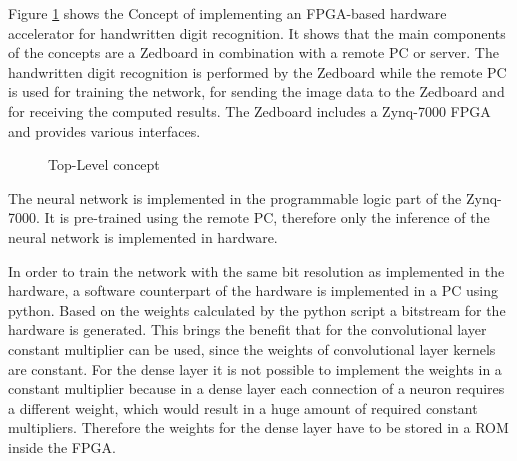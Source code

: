 Figure \ref{FIG:concept} shows the Concept of implementing an FPGA-based hardware accelerator for handwritten digit recognition. It shows that the main components of the concepts are a Zedboard in combination with a remote PC or server. The handwritten digit recognition is performed by the Zedboard while the remote PC is used for training the network, for sending the image data to the Zedboard and for receiving the computed results.  The Zedboard includes a Zynq-7000 FPGA and provides various interfaces.

\begin{figure}[h]
	\centering
	
	\caption[Top-Level concept.]{Top-Level concept}
	\label{FIG:concept}
\end{figure}


The neural network is implemented in the programmable logic part of the Zynq-7000. It is pre-trained using the remote PC, therefore only the inference of the neural network is implemented in hardware.

In order to train the network with the same bit resolution as implemented in the hardware, a software counterpart of the hardware is implemented in a PC using python. 
Based on the weights calculated by the python script a bitstream for the hardware is generated. This brings the benefit that for the convolutional layer constant multiplier can be used, since the weights of convolutional layer kernels are constant. For the dense layer it is not possible to implement the weights in a constant multiplier because in a dense layer each connection of a neuron requires a different weight, which would result in a huge amount of required constant multipliers. Therefore the weights for the dense layer have to be stored in a ROM inside the FPGA.
